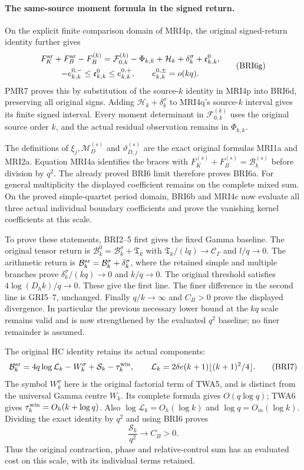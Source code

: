 \documentclass[11pt,a4paper]{article}
\begin{document}
\paragraph{The same-source moment formula in the signed return.}
On the explicit finite comparison domain of MRI4p, the original
signed-return identity further gives
\[
 \begin{gathered}
 F_K^{\rm ar}+F_B^{\rm ar}-F_B^{(k)}
   =\mathcal F_{0,k}^{(k)}-\Phi_{k,k}
       +\mathcal H_k+\delta_k^\sigma+\mathfrak e^0_{k,k},\\
 -e_{k,k}^{0,-}\le\mathfrak e^0_{k,k}\le e_{k,k}^{0,+},\qquad
 e_{k,k}^{0,\pm}=o(kq).
 \end{gathered}\tag{BRI6g}
\]
PMR7 proves this by substitution of the source-$k$ identity in
MRI4p into BRI6d, preserving all original signs. Adding
$\mathcal H_k+\delta_k^\sigma$ to MRI4q's source-$k$ interval
gives its finite signed interval. Every moment determinant in
$\mathcal F_{0,k}^{(k)}$ uses the original source order $k$,
and the actual residual observation remains in $\Phi_{k,k}$.


The definitions of $\xi_j,\mathcal M_D^{(s)}$ and
$\vartheta_{D,j}^{(s)}$ are the exact original formulas MRI1a
and MRI2a. Equation MRI4a identifies the braces with
$F_K^{(s)}+F_B^{(s)}=\mathcal B_k^{(s)}$ before division by
$q^2$. The already proved BRI6 limit therefore proves BRI6a.
For general multiplicity the displayed coefficient remains on the
complete mixed sum. On the proved simple-quartet period domain,
BRI6b and MRI4c now evaluate all three actual individual boundary
coefficients and prove the vanishing kernel coefficients at this scale.

To prove these statements, BRI2--5 first gives the fixed Gamma
baseline. The original tensor return is
$\mathcal B_k^0=\mathcal B_k^\sigma+\mathfrak T_k$ with
$\mathfrak T_k/(lq)\to\mathcal C_\Gamma$ and $l/q\to0$.
The arithmetic return is
$\mathcal B_k^{\rm ar}=\mathcal B_k^\sigma+\delta_k^\sigma$,
where the retained simple and multiple branches prove
$\delta_k^\sigma/(kq)\to0$ and $k/q\to0$.
The original threshold satisfies $4\log(D_hk)/q\to0$.
These give the first line. The finer difference in the second line
is GRI5--7, unchanged. Finally $q/k\to\infty$ and $C_B>0$
prove the displayed divergence. In particular the previous necessary
lower bound at the $kq$ scale remains valid and is now strengthened
by the evaluated $q^2$ baseline; no finer remainder is assumed.

The original HC identity retains its actual components:
\[
 \mathcal B_k^{\rm ar}=4q\log\mathcal L_k-W_k^\sigma
                  +\mathcal S_k-\tau_k^{\rm win},\qquad
 \mathcal L_k=2\delta e(k+1)\lfloor(k+1)^2/4\rfloor.
 \tag{BRI7}
\]
The symbol $W_k^\sigma$ here is the original factorial term of
TWA5, and is distinct from the universal Gamma centre $W_k$.
Its complete formula gives $O(q\log q)$; TWA6 gives
$\tau_k^{\rm win}=O_h(k+\log q)$. Also
$\log\mathcal L_k=O_h(\log k)$ and $\log q=O_m(\log k)$.
Dividing the exact identity by $q^2$ and using BRI6 proves
\[
 \frac{\mathcal S_k}{q^2}\longrightarrow C_B>0.
 \tag{BRI8}
\]
Thus the original contraction, phase and relative-control sum has
an evaluated cost on this scale, with its individual terms retained.
\end{document}
